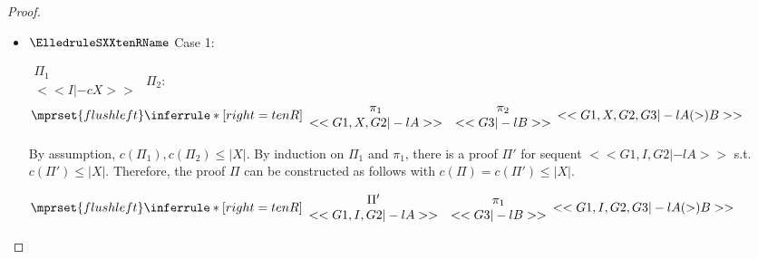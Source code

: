 \begin{proof}
\begin{enumerate}
\begin{itemize}
  \item $\ElledruleSXXtenRName$ Case 1:
      \begin{center}
        \scriptsize
        \begin{math}
          \begin{array}{c}
            \Pi_1 \\
            {<<I |-c X>>}
          \end{array}
        \end{math}
        \qquad\qquad
        $\Pi_2$:
        \begin{math}
          $$\mprset{flushleft}
          \inferrule* [right={\tiny tenR}] {
            {
              \begin{array}{cc}
                \pi_1 & \pi_2 \\
                {<<G1, X, G2 |-l A>>} & {<<G3 |-l B>>}
              \end{array}
            }
          }{<<G1, X, G2, G3 |-l A (>) B>>}
        \end{math}
      \end{center}
      By assumption, $c(\Pi_1),c(\Pi_2)\leq |X|$. By induction on $\Pi_1$ and $\pi_1$, there
      is a proof $\Pi'$ for sequent $<<G1, I, G2 |-l A>>$ s.t. $c(\Pi') \leq |X|$. Therefore,
      the proof $\Pi$ can be constructed as follows with $c(\Pi) = c(\Pi') \leq |X|$.
      \begin{center}
        \scriptsize
        \begin{math}
          $$\mprset{flushleft}
          \inferrule* [right={\tiny tenR}] {
            {
              \begin{array}{cc}
                \Pi' & \pi_1 \\
                {<<G1, I, G2 |-l A>>} & {<<G3 |-l B>>}
              \end{array}
            }
          }{<<G1, I, G2, G3 |-l A (>) B>>}
        \end{math}
      \end{center}


\end{itemize}
\end{enumerate}
\end{proof}
